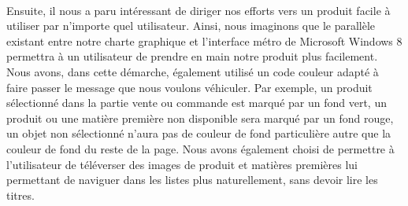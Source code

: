     \paragraph{}
        Ensuite, il nous a paru intéressant de diriger nos efforts vers un
        produit facile à utiliser par n'importe quel utilisateur.
        Ainsi, nous imaginons que le parallèle existant entre notre charte
        graphique et l'interface métro de Microsoft Windows 8 permettra à un
        utilisateur de prendre en main notre produit plus facilement.
        Nous avons, dans cette démarche, également utilisé un code couleur
        adapté à faire passer le message que nous voulons véhiculer.
        Par exemple, un produit sélectionné dans la partie vente ou commande
        est marqué par un fond vert, un produit ou une matière première non
        disponible sera marqué par un fond rouge, un objet non sélectionné
        n'aura pas de couleur de fond particulière autre que la couleur de fond
        du reste de la page.
        Nous avons également choisi de permettre à l'utilisateur de téléverser
        des images de produit et matières premières lui permettant de naviguer
        dans les listes plus naturellement, sans devoir lire les titres.